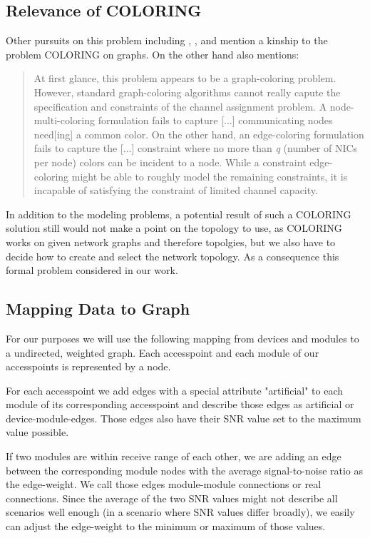   \subsection{Relevance of COLORING}
    Other pursuits on this problem including \cite{BFS-CA}, \cite{CTA}, \cite{caa_tricky} and \cite{katzela} mention a kinship to the problem COLORING on graphs.
    On the other hand \cite{caa_tricky} also mentions:
    
    \begin{quote}
      At first glance, this problem appears to be a graph-coloring problem. However, standard graph-coloring algorithms cannot really capute the specification and constraints 
      of the channel assignment problem. A node-multi-coloring formulation fails to capture [...] communicating nodes need[ing] a common color. On the other hand,
      an edge-coloring formulation fails to capture the [...] constraint where no more than \textit{q} (number of NICs per node) colors can be incident to a node.
      While a constraint edge-coloring might be able to roughly model the remaining constraints, it is incapable of satisfying the constraint of limited channel capacity.
    \end{quote}
    
    In addition to the modeling problems, a potential result of such a COLORING solution still would not make a point on the topology to use,
    as COLORING works on given network graphs and therefore topolgies, but we also have to decide how to create and select the network topology.
    As a consequence this formal problem considered in our work.
    
  \subsection{Mapping Data to Graph}
    For our purposes we will use the following mapping from devices and modules to a undirected, weighted graph.
    Each accesspoint and each module of our accesspoints is represented by a node.
    
    For each accesspoint we add edges with a special attribute "artificial" 
    to each module of its corresponding accesspoint and describe those edges as artificial or device-module-edges.
    Those edges also have their SNR value set to the maximum value possible. 
    
    If two modules are within receive range of each other, 
    we are adding an edge between the corresponding module nodes with the average signal-to-noise ratio as the edge-weight.
    We call those edges module-module connections or real connections.
    Since the average of the two SNR values might not describe all scenarios well enough (in a scenario where SNR values differ broadly),
    we easily can adjust the edge-weight to the minimum or maximum of those values.
    
